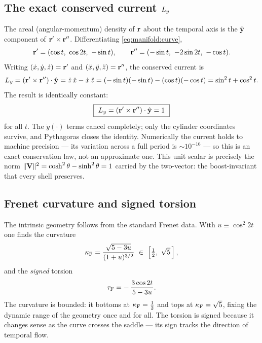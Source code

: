 \subsection{The exact conserved current $L_{y}$}

The areal (angular-momentum) density of $\mathbf{r}$ about the temporal axis is the $\hat{\mathbf{y}}$ component of $\mathbf{r}'\times\mathbf{r}''$. Differentiating \eqref{eq:manifold:curve},
\begin{equation}
\mathbf{r}'=(\cos t,\ \cos 2t,\ -\sin t),\qquad
\mathbf{r}''=(-\sin t,\ -2\sin 2t,\ -\cos t).
\label{eq:manifold:derivs}
\end{equation}
Writing $(\dot x,\dot y,\dot z)=\mathbf{r}'$ and $(\ddot x,\ddot y,\ddot z)=\mathbf{r}''$, the conserved current is
\begin{equation}
L_{y}=(\mathbf{r}'\times\mathbf{r}'')\cdot\hat{\mathbf{y}}
=\dot z\,\ddot x-\dot x\,\ddot z
=(-\sin t)(-\sin t)-(\cos t)(-\cos t)
=\sin^{2}t+\cos^{2}t.
\label{eq:manifold:Ly}
\end{equation}
The result is identically constant:
\begin{equation}
\boxed{\ \Ly=(\rr'\times\rr'')\cdot\hat{\mathbf{y}}=1\ }
\label{eq:manifold:Ly_boxed}
\end{equation}
for all $t$. The $\dot y\ddot{(\cdot)}$ terms cancel completely; only the cylinder coordinates survive, and Pythagoras closes the identity. Numerically the current holds to machine precision — its variation across a full period is $\sim 10^{-16}$ — so this is an exact conservation law, not an approximate one. This unit scalar is precisely the norm $\|\mathbf{V}\|^{2}=\cosh^{2}\theta-\sinh^{2}\theta=1$ carried by the two-vector: the boost-invariant that every shell preserves.

\subsection{Frenet curvature and signed torsion}

The intrinsic geometry follows from the standard Frenet data. With $u\equiv\cos^{2}2t$ one finds the curvature
\begin{equation}
\kfren=\frac{\sqrt{5-3u}}{(1+u)^{3/2}}\ \in\ \left[\tfrac{1}{2},\ \sqrt{5}\,\right],
\label{eq:manifold:curvature}
\end{equation}
and the \emph{signed} torsion
\begin{equation}
\tau_{\mathrm{F}}=-\,\frac{3\cos 2t}{\,5-3u\,}.
\label{eq:manifold:torsion}
\end{equation}
The curvature is bounded: it bottoms at $\kappa_{\mathrm{F}}=\tfrac12$ and tops at $\kappa_{\mathrm{F}}=\sqrt5$, fixing the dynamic range of the geometry once and for all. The torsion is signed because it changes sense as the curve crosses the saddle — its sign tracks the direction of temporal flow.

